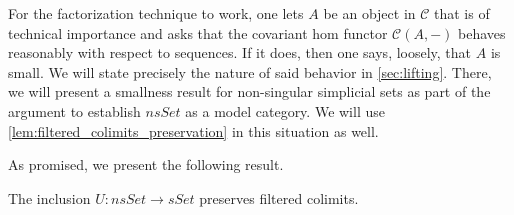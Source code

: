 For the factorization technique to work, one lets $A$ be an object in $\mathscr{C}$ that is of technical importance and asks that the covariant hom functor $\mathscr{C} (A,-)$ behaves reasonably with respect to sequences. If it does, then one says, loosely, that $A$ is small. We will state precisely the nature of said behavior in \cref{sec:lifting}. There, we will present a smallness result for non-singular simplicial sets as part of the argument to establish $nsSet$ as a model category. We will use \cref{lem:filtered_colimits_preservation} in this situation as well.

As promised, we present the following result.
\begin{lemma}\label{lem:filtered_colimits_preservation}
The inclusion $U:nsSet\to sSet$ preserves filtered colimits.
\end{lemma}

